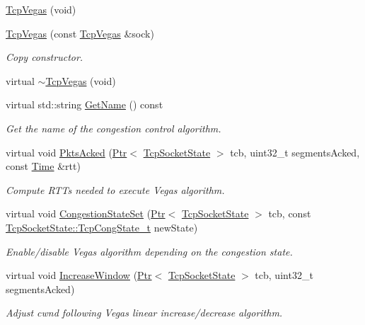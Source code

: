 \begin{DoxyCompactItemize}
\item 
\hyperlink{classns3_1_1TcpVegas_a478ef6447286c84890ac2e1d62fb297c}{Tcp\+Vegas} (void)
\item 
\hyperlink{classns3_1_1TcpVegas_ae43b2628fb78cd49de46c4214bcaba23}{Tcp\+Vegas} (const \hyperlink{classns3_1_1TcpVegas}{Tcp\+Vegas} \&sock)
\begin{DoxyCompactList}\small\item\em Copy constructor. \end{DoxyCompactList}\item 
virtual \hyperlink{classns3_1_1TcpVegas_a0e8d5c0cc41188482bb153643424c5b1}{$\sim$\+Tcp\+Vegas} (void)
\item 
virtual std\+::string \hyperlink{classns3_1_1TcpVegas_a476e123ec5b2cfd44f68ac4063fe3f0c}{Get\+Name} () const 
\begin{DoxyCompactList}\small\item\em Get the name of the congestion control algorithm. \end{DoxyCompactList}\item 
virtual void \hyperlink{classns3_1_1TcpVegas_adb646411aad266d6db894b88f2baff0f}{Pkts\+Acked} (\hyperlink{classns3_1_1Ptr}{Ptr}$<$ \hyperlink{classns3_1_1TcpSocketState}{Tcp\+Socket\+State} $>$ tcb, uint32\+\_\+t segments\+Acked, const \hyperlink{classns3_1_1Time}{Time} \&rtt)
\begin{DoxyCompactList}\small\item\em Compute R\+T\+Ts needed to execute Vegas algorithm. \end{DoxyCompactList}\item 
virtual void \hyperlink{classns3_1_1TcpVegas_a0e82c50f7d326449fca838e46cbb9821}{Congestion\+State\+Set} (\hyperlink{classns3_1_1Ptr}{Ptr}$<$ \hyperlink{classns3_1_1TcpSocketState}{Tcp\+Socket\+State} $>$ tcb, const \hyperlink{classns3_1_1TcpSocketState_a6fc313945a33d48fd60cbffe0c787b19}{Tcp\+Socket\+State\+::\+Tcp\+Cong\+State\+\_\+t} new\+State)
\begin{DoxyCompactList}\small\item\em Enable/disable Vegas algorithm depending on the congestion state. \end{DoxyCompactList}\item 
virtual void \hyperlink{classns3_1_1TcpVegas_ae80e9ac677116dada43dacda0f98a8b6}{Increase\+Window} (\hyperlink{classns3_1_1Ptr}{Ptr}$<$ \hyperlink{classns3_1_1TcpSocketState}{Tcp\+Socket\+State} $>$ tcb, uint32\+\_\+t segments\+Acked)
\begin{DoxyCompactList}\small\item\em Adjust cwnd following Vegas linear increase/decrease algorithm. \end{DoxyCompactList}\item 

\end{DoxyCompactItemize}
